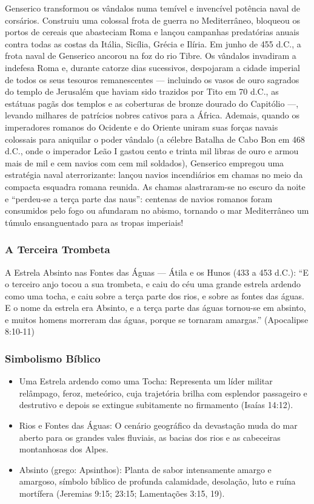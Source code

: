 \documentclass[11pt,a4paper,openany]{book}
\begin{document}
Genserico transformou os vândalos numa temível e invencível potência naval de corsários. Construiu uma colossal frota de guerra no Mediterrâneo, bloqueou os portos de cereais que abasteciam Roma e lançou campanhas predatórias anuais contra todas as costas da Itália, Sicília, Grécia e Ilíria.
Em junho de 455 d.C., a frota naval de Genserico ancorou na foz do rio Tibre. Os vândalos invadiram a indefesa Roma e, durante catorze dias sucessivos, despojaram a cidade imperial de todos os seus tesouros remanescentes — incluindo os vasos de ouro sagrados do templo de Jerusalém que haviam sido trazidos por Tito em 70 d.C., as estátuas pagãs dos templos e as coberturas de bronze dourado do Capitólio —, levando milhares de patrícios nobres cativos para a África.
Ademais, quando os imperadores romanos do Ocidente e do Oriente uniram suas forças navais colossais para aniquilar o poder vândalo (a célebre Batalha de Cabo Bon em 468 d.C., onde o imperador Leão I gastou cento e trinta mil libras de ouro e armou mais de mil e cem navios com cem mil soldados), Genserico empregou uma estratégia naval aterrorizante: lançou navios incendiários em chamas no meio da compacta esquadra romana reunida. As chamas alastraram-se no escuro da noite e ``perdeu-se a terça parte das naus'': centenas de navios romanos foram consumidos pelo fogo ou afundaram no abismo, tornando o mar Mediterrâneo um túmulo ensanguentado para as tropas imperiais!


\subsubsection*{A Terceira Trombeta}
A Estrela Absinto nas Fontes das Águas — Átila e os Hunos (433 a 453 d.C.):
``E o terceiro anjo tocou a sua trombeta, e caiu do céu uma grande estrela ardendo como uma tocha, e caiu sobre a terça parte dos rios, e sobre as fontes das águas. E o nome da estrela era Absinto, e a terça parte das águas tornou-se em absinto, e muitos homens morreram das águas, porque se tornaram amargas.'' (Apocalipse 8:10-11)


\subsubsection*{Simbolismo Bíblico}
\begin{itemize}
  \item Uma Estrela ardendo como uma Tocha: Representa um líder militar relâmpago, feroz, meteórico, cuja trajetória brilha com esplendor passageiro e destrutivo e depois se extingue subitamente no firmamento (Isaías 14:12).
  \item Rios e Fontes das Águas: O cenário geográfico da devastação muda do mar aberto para os grandes vales fluviais, as bacias dos rios e as cabeceiras montanhosas dos Alpes.
  \item Absinto (grego: Apsinthos): Planta de sabor intensamente amargo e amargoso, símbolo bíblico de profunda calamidade, desolação, luto e ruína mortífera (Jeremias 9:15; 23:15; Lamentações 3:15, 19).
\end{itemize}
\end{document}
